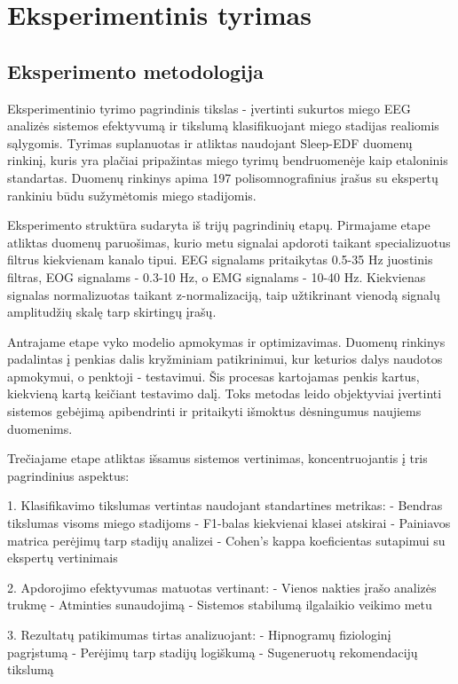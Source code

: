 \section{Eksperimentinis tyrimas}
\subsection{Eksperimento metodologija}

Eksperimentinio tyrimo pagrindinis tikslas - įvertinti sukurtos miego EEG analizės sistemos efektyvumą ir tikslumą klasifikuojant miego stadijas realiomis sąlygomis. Tyrimas suplanuotas ir atliktas naudojant Sleep-EDF duomenų rinkinį, kuris yra plačiai pripažintas miego tyrimų bendruomenėje kaip etaloninis standartas. Duomenų rinkinys apima 197 polisomnografinius įrašus su ekspertų rankiniu būdu sužymėtomis miego stadijomis.

Eksperimento struktūra sudaryta iš trijų pagrindinių etapų. Pirmajame etape atliktas duomenų paruošimas, kurio metu signalai apdoroti taikant specializuotus filtrus kiekvienam kanalo tipui. EEG signalams pritaikytas 0.5-35 Hz juostinis filtras, EOG signalams - 0.3-10 Hz, o EMG signalams - 10-40 Hz. Kiekvienas signalas normalizuotas taikant z-normalizaciją, taip užtikrinant vienodą signalų amplitudžių skalę tarp skirtingų įrašų.

Antrajame etape vyko modelio apmokymas ir optimizavimas. Duomenų rinkinys padalintas į penkias dalis kryžminiam patikrinimui, kur keturios dalys naudotos apmokymui, o penktoji - testavimui. Šis procesas kartojamas penkis kartus, kiekvieną kartą keičiant testavimo dalį. Toks metodas leido objektyviai įvertinti sistemos gebėjimą apibendrinti ir pritaikyti išmoktus dėsningumus naujiems duomenims.

Trečiajame etape atliktas išsamus sistemos vertinimas, koncentruojantis į tris pagrindinius aspektus:

1. Klasifikavimo tikslumas vertintas naudojant standartines metrikas:
   - Bendras tikslumas visoms miego stadijoms
   - F1-balas kiekvienai klasei atskirai
   - Painiavos matrica perėjimų tarp stadijų analizei
   - Cohen's kappa koeficientas sutapimui su ekspertų vertinimais

2. Apdorojimo efektyvumas matuotas vertinant:
   - Vienos nakties įrašo analizės trukmę
   - Atminties sunaudojimą
   - Sistemos stabilumą ilgalaikio veikimo metu

3. Rezultatų patikimumas tirtas analizuojant:
   - Hipnogramų fiziologinį pagrįstumą
   - Perėjimų tarp stadijų logiškumą
   - Sugeneruotų rekomendacijų tikslumą

